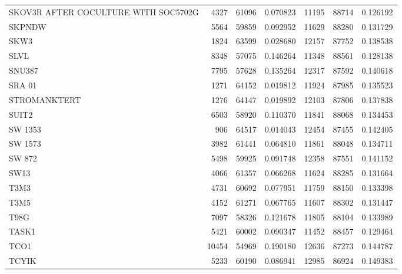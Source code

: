 \begin{tabular}{lrrrrrr}
 SKOV3R AFTER COCULTURE WITH SOC5702G &      4327 &    61096 &  0.070823 &     11195 &    88714 &  0.126192 \\
                               SKPNDW &      5564 &    59859 &  0.092952 &     11629 &    88280 &  0.131729 \\
                                 SKW3 &      1824 &    63599 &  0.028680 &     12157 &    87752 &  0.138538 \\
                                 SLVL &      8348 &    57075 &  0.146264 &     11348 &    88561 &  0.128138 \\
                               SNU387 &      7795 &    57628 &  0.135264 &     12317 &    87592 &  0.140618 \\
                               SRA 01 &      1271 &    64152 &  0.019812 &     11924 &    87985 &  0.135523 \\
                         STROMANKTERT &      1276 &    64147 &  0.019892 &     12103 &    87806 &  0.137838 \\
                                SUIT2 &      6503 &    58920 &  0.110370 &     11841 &    88068 &  0.134453 \\
                              SW 1353 &       906 &    64517 &  0.014043 &     12454 &    87455 &  0.142405 \\
                              SW 1573 &      3982 &    61441 &  0.064810 &     11861 &    88048 &  0.134711 \\
                               SW 872 &      5498 &    59925 &  0.091748 &     12358 &    87551 &  0.141152 \\
                                 SW13 &      4066 &    61357 &  0.066268 &     11624 &    88285 &  0.131664 \\
                                 T3M3 &      4731 &    60692 &  0.077951 &     11759 &    88150 &  0.133398 \\
                                 T3M5 &      4152 &    61271 &  0.067765 &     11607 &    88302 &  0.131447 \\
                                 T98G &      7097 &    58326 &  0.121678 &     11805 &    88104 &  0.133989 \\
                                TASK1 &      5421 &    60002 &  0.090347 &     11452 &    88457 &  0.129464 \\
                                 TCO1 &     10454 &    54969 &  0.190180 &     12636 &    87273 &  0.144787 \\
                                TCYIK &      5233 &    60190 &  0.086941 &     12985 &    86924 &  0.149383 \\

\end{tabular}
